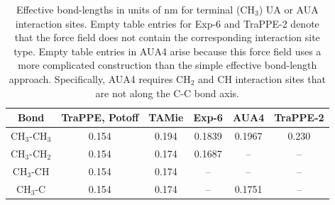 \documentclass[preprint,letterpaper,floatfix,citeautoscript,aip,jcp]{revtex4-1}
\begin{document}
\begin{table}[h!]
	\caption{Effective bond-lengths in units of nm for terminal (CH$_3$) UA or AUA interaction sites. Empty table entries for Exp-6 \cite{Exp6} and TraPPE-2 \cite{TraPPEUA2} denote that the force field does not contain the corresponding interaction site type. Empty table entries in AUA4 \cite{AUA4} arise because this force field uses a more complicated construction than the simple effective bond-length approach. Specifically, AUA4 requires CH$_2$ and CH interaction sites that are not along the C-C bond axis.} \label{tab:bond-lengths}
	\begin{center}
		\begin{tabular}{|c|c|c|c|c|c|}
			\hline
			Bond & TraPPE, Potoff & TAMie & Exp-6 & AUA4 & TraPPE-2 \\ \hline
			CH$_3$-CH$_3$ & 0.154 & 0.194 & 0.1839 & 0.1967 & 0.230 \\ 
			CH$_3$-CH$_2$ & 0.154 & 0.174 & 0.1687 & -- & -- \\ 
			CH$_3$-CH & 0.154 & 0.174 & -- & -- & -- \\
			CH$_3$-C & 0.154 & 0.174 & -- & 0.1751 & -- \\
			\hline
		\end{tabular}
	\end{center} 
\end{table}

\end{document}
